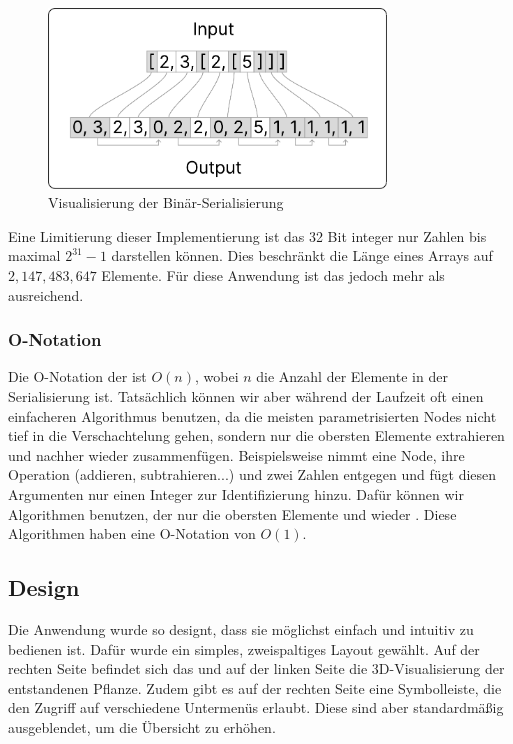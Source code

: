 \documentclass[ngerman]{article}
\begin{document}
\begin{figure}[htbp]
  \centering
  \includegraphics[width=0.8\textwidth]{./graphics/ENCODING_SCHEME.pdf}
  \caption{Visualisierung der Binär-Serialisierung}
  \label{fig:encoding_scheme}
\end{figure}

Eine Limitierung dieser Implementierung ist das 32 Bit integer nur Zahlen bis maximal $2^{31}-1$ darstellen können. Dies beschränkt die Länge eines Arrays auf $2,147,483,647$ Elemente. Für diese Anwendung ist das jedoch mehr als ausreichend.

\subsubsection*{O-Notation}
Die O-Notation der  ist $O(n)$, wobei $n$ die Anzahl der Elemente in der Serialisierung ist. Tatsächlich können wir aber während der Laufzeit oft einen einfacheren Algorithmus benutzen, da die meisten parametrisierten Nodes nicht tief in die Verschachtelung gehen, sondern nur die obersten Elemente extrahieren und nachher wieder zusammenfügen. 
\br
Beispielsweise nimmt eine  Node, ihre Operation (addieren, subtrahieren...) und zwei Zahlen entgegen und fügt diesen Argumenten nur einen Integer zur Identifizierung hinzu. Dafür können wir Algorithmen benutzen, der nur die obersten Elemente  und wieder .  Diese Algorithmen haben eine O-Notation von $O(1)$.

\pagebreak

\subsection{Design}

Die Anwendung wurde so designt, dass sie möglichst einfach und intuitiv zu bedienen ist. Dafür wurde ein simples, zweispaltiges Layout gewählt. Auf der rechten Seite befindet sich das  und auf der linken Seite die 3D-Visualisierung der entstandenen Pflanze. Zudem gibt es auf der rechten Seite eine Symbolleiste, die den Zugriff auf verschiedene Untermenüs erlaubt. Diese sind aber standardmäßig ausgeblendet, um die Übersicht zu erhöhen.
\end{document}
